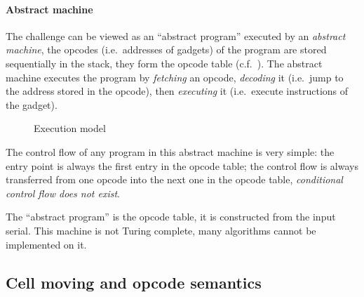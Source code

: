 \documentclass{easychair}
\begin{document}
\paragraph{Abstract machine}
The challenge can be viewed as an ``abstract program'' executed by an \emph{abstract machine}, the opcodes (i.e.~addresses of gadgets) of the program are stored sequentially in the stack, they form the opcode table (c.f.~). The abstract machine executes the program by \emph{fetching} an opcode, \emph{decoding} it (i.e.~jump to the address stored in the opcode), then \emph{executing} it (i.e.~execute instructions of the gadget).

\begin{figure}[h]
  \centering
  \caption{Execution model}
  \label{fig:execution_model}
\end{figure}

The control flow of any program in this abstract machine is very simple: the entry point is always the first entry in the opcode table; the control flow is always transferred from one opcode into the next one in the opcode table, \emph{conditional control flow does not exist}.

\begin{remark}
  The ``abstract program'' is the opcode table, it is constructed from the input serial. This machine is not Turing complete, many algorithms cannot be implemented on it.
\end{remark}

\subsection{Cell moving and opcode semantics}
\label{sec:opcode_semantics}
\end{document}
